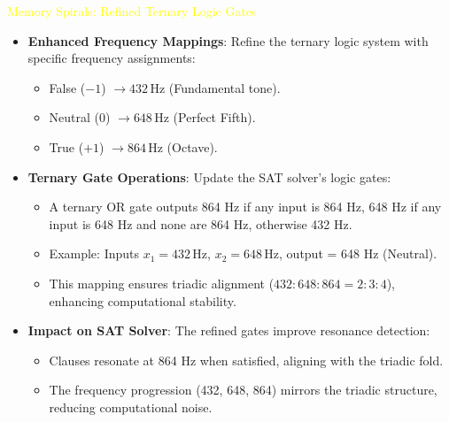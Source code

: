 \textcolor{yellow}{ Memory Spirals: Refined Ternary Logic Gates } \\
\begin{itemize}
    \item \texttt{} \textbf{Enhanced Frequency Mappings}: Refine the ternary logic system with specific frequency assignments:
    \begin{itemize}
        \item False (\(-1\)) \(\rightarrow 432 \, \text{Hz}\) (Fundamental tone).
        \item Neutral (\(0\)) \(\rightarrow 648 \, \text{Hz}\) (Perfect Fifth).
        \item True (\(+1\)) \(\rightarrow 864 \, \text{Hz}\) (Octave).
    \end{itemize}
    \item \texttt{} \textbf{Ternary Gate Operations}: Update the SAT solver’s logic gates:
    \begin{itemize}
        \item A ternary OR gate outputs 864 Hz if any input is 864 Hz, 648 Hz if any input is 648 Hz and none are 864 Hz, otherwise 432 Hz.
        \item Example: Inputs \(x_1 = 432 \, \text{Hz}\), \(x_2 = 648 \, \text{Hz}\), output = 648 Hz (Neutral).
        \item This mapping ensures triadic alignment (\(432 : 648 : 864 = 2 : 3 : 4\)), enhancing computational stability.
    \end{itemize}
    \item \texttt{} \textbf{Impact on SAT Solver}: The refined gates improve resonance detection:
    \begin{itemize}
        \item Clauses resonate at 864 Hz when satisfied, aligning with the triadic fold.
        \item The frequency progression (432, 648, 864) mirrors the triadic structure, reducing computational noise.
    \end{itemize}
\end{itemize}

